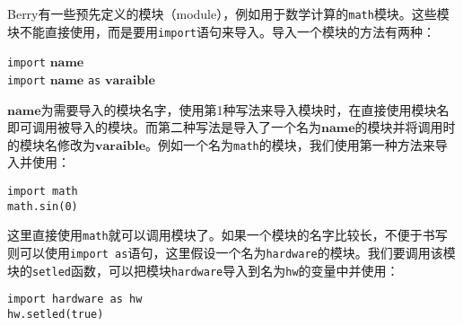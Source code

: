 Berry有一些预先定义的模块（module），例如用于数学计算的\texttt{math}模块。这些模块不能直接使用，而是要用\texttt{import}语句来导入。导入一个模块的方法有两种：
\begin{algorithm}
    \texttt{import} $\bm{name}$ \\
    \texttt{import} $\bm{name}$ \texttt{as} $\bm{varaible}$
\end{algorithm}
$\bm{name}$为需要导入的模块名字，使用第1种写法来导入模块时，在直接使用模块名即可调用被导入的模块。而第二种写法是导入了一个名为$\bm{name}$的模块并将调用时的模块名修改为$\bm{varaible}$。例如一个名为\texttt{math}的模块，我们使用第一种方法来导入并使用：
\begin{lstlisting}[language=berry, numbers=none]
import math
math.sin(0)
\end{lstlisting}
这里直接使用\texttt{math}就可以调用模块了。如果一个模块的名字比较长，不便于书写则可以使用\texttt{import as}语句，这里假设一个名为\texttt{hardware}的模块。我们要调用该模块的\texttt{setled}函数，可以把模块\texttt{hardware}导入到名为\texttt{hw}的变量中并使用：
\begin{lstlisting}[language=berry, numbers=none]
import hardware as hw
hw.setled(true)
\end{lstlisting}
